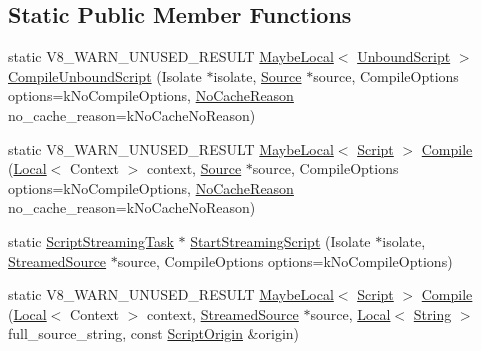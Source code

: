 \subsection*{Static Public Member Functions}
\begin{DoxyCompactItemize}
\item 
static V8\+\_\+\+W\+A\+R\+N\+\_\+\+U\+N\+U\+S\+E\+D\+\_\+\+R\+E\+S\+U\+LT \mbox{\hyperlink{classv8_1_1MaybeLocal}{Maybe\+Local}}$<$ \mbox{\hyperlink{classv8_1_1UnboundScript}{Unbound\+Script}} $>$ \mbox{\hyperlink{classv8_1_1ScriptCompiler_a4054a9857df7f2e6a8747f23108776e7}{Compile\+Unbound\+Script}} (Isolate $\ast$isolate, \mbox{\hyperlink{classv8_1_1ScriptCompiler_1_1Source}{Source}} $\ast$source, Compile\+Options options=k\+No\+Compile\+Options, \mbox{\hyperlink{classv8_1_1ScriptCompiler_a7f13fa15484cfc500ae51927756e0d60}{No\+Cache\+Reason}} no\+\_\+cache\+\_\+reason=k\+No\+Cache\+No\+Reason)
\item 
static V8\+\_\+\+W\+A\+R\+N\+\_\+\+U\+N\+U\+S\+E\+D\+\_\+\+R\+E\+S\+U\+LT \mbox{\hyperlink{classv8_1_1MaybeLocal}{Maybe\+Local}}$<$ \mbox{\hyperlink{classv8_1_1Script}{Script}} $>$ \mbox{\hyperlink{classv8_1_1ScriptCompiler_a217bcf520f4ed70f6f02afeabfe60319}{Compile}} (\mbox{\hyperlink{classv8_1_1Local}{Local}}$<$ Context $>$ context, \mbox{\hyperlink{classv8_1_1ScriptCompiler_1_1Source}{Source}} $\ast$source, Compile\+Options options=k\+No\+Compile\+Options, \mbox{\hyperlink{classv8_1_1ScriptCompiler_a7f13fa15484cfc500ae51927756e0d60}{No\+Cache\+Reason}} no\+\_\+cache\+\_\+reason=k\+No\+Cache\+No\+Reason)
\item 
static \mbox{\hyperlink{classv8_1_1ScriptCompiler_1_1ScriptStreamingTask}{Script\+Streaming\+Task}} $\ast$ \mbox{\hyperlink{classv8_1_1ScriptCompiler_a406bb44ef02d644d94bccd3f7b04f2d4}{Start\+Streaming\+Script}} (Isolate $\ast$isolate, \mbox{\hyperlink{classv8_1_1ScriptCompiler_1_1StreamedSource}{Streamed\+Source}} $\ast$source, Compile\+Options options=k\+No\+Compile\+Options)
\item 
static V8\+\_\+\+W\+A\+R\+N\+\_\+\+U\+N\+U\+S\+E\+D\+\_\+\+R\+E\+S\+U\+LT \mbox{\hyperlink{classv8_1_1MaybeLocal}{Maybe\+Local}}$<$ \mbox{\hyperlink{classv8_1_1Script}{Script}} $>$ \mbox{\hyperlink{classv8_1_1ScriptCompiler_a2381d1572e778efee274caaaaa765e0c}{Compile}} (\mbox{\hyperlink{classv8_1_1Local}{Local}}$<$ Context $>$ context, \mbox{\hyperlink{classv8_1_1ScriptCompiler_1_1StreamedSource}{Streamed\+Source}} $\ast$source, \mbox{\hyperlink{classv8_1_1Local}{Local}}$<$ \mbox{\hyperlink{classv8_1_1String}{String}} $>$ full\+\_\+source\+\_\+string, const \mbox{\hyperlink{classv8_1_1ScriptOrigin}{Script\+Origin}} \&origin)

\end{DoxyCompactItemize}
